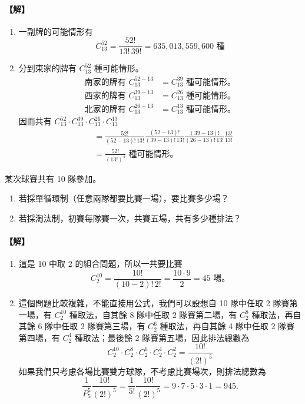 \paragraph{【解】}
\begin{enumerate}[label=(\roman*), topsep=2pt, itemsep=4pt]
  \item 一副牌的可能情形有
  \[
  C_{13}^{52} = \frac{52!}{13!\, 39!} = 635{,}013{,}559{,}600 \text{ 種}
  \]
  \item 分到東家的牌有 $C_{13}^{52}$ 種可能情形。
  \begin{align*}
  \text{南家的牌有 } C_{13}^{52-13} &= C_{13}^{39} \text{ 種可能情形。} \\
  \text{西家的牌有 } C_{13}^{39-13} &= C_{13}^{26} \text{ 種可能情形。} \\
  \text{北家的牌有 } C_{13}^{26-13} &= C_{13}^{13} \text{ 種可能情形。}
  \end{align*}
  因而共有 $C_{13}^{52} \cdot C_{13}^{39} \cdot C_{13}^{26} \cdot C_{13}^{13}$
  \begin{align*}
  &= \frac{52!}{(52-13)!\, 13!} \frac{(52-13)!}{(39-13)!\, 13!} \frac{(39-13)!}{(26-13)!\, 13!} \frac{13!}{13!} \\
  &= \frac{52!}{(13!)^4} \text{ 種可能情形。}
  \end{align*}
\end{enumerate}

\medskip
\begin{example}\label{ex:b5s-2-16}
某次球賽共有 10 隊參加。
\begin{enumerate}[label=(\roman*), topsep=2pt, itemsep=4pt]
  \item 若採單循環制（任意兩隊都要比賽一場），要比賽多少場？
  \item 若採淘汰制，初賽每隊賽一次，共賽五場，共有多少種排法？
\end{enumerate}
\end{example}
\paragraph{【解】}
\begin{enumerate}[label=(\roman*), topsep=2pt, itemsep=4pt]
  \item 這是 10 中取 2 的組合問題，所以一共要比賽
  \[
  C_2^{10} = \frac{10!}{(10-2)!\, 2!} = \frac{10 \cdot 9}{2} = 45 \text{ 場。}
  \]
  \item 這個問題比較複雜，不能直接用公式，我們可以設想自 10 隊中任取 2 隊賽第一場，有 $C_2^{10}$ 種取法，自其餘 8 隊中任取 2 隊賽第二場，有 $C_2^8$ 種取法，再自其餘 6 隊中任取 2 隊賽第三場，有 $C_2^6$ 種取法，再自其餘 4 隊中任取 2 隊賽第四場，有 $C_2^4$ 種取法；最後餘 2 隊賽第五場，因此排法總數為
  \[
  C_2^{10} \cdot C_2^8 \cdot C_2^6 \cdot C_2^4 \cdot C_2^2 = \frac{10!}{(2!)^5}
  \]
  如果我們只考慮各場比賽雙方球隊，不考慮比賽場次，則排法總數為
  \[
  \frac{1}{P_5^5} \frac{10!}{(2!)^5} = \frac{1}{5!} \frac{10!}{(2!)^5} = 9 \cdot 7 \cdot 5 \cdot 3 \cdot 1 = 945. \tag*{$\#$}
  \]
\end{enumerate}

